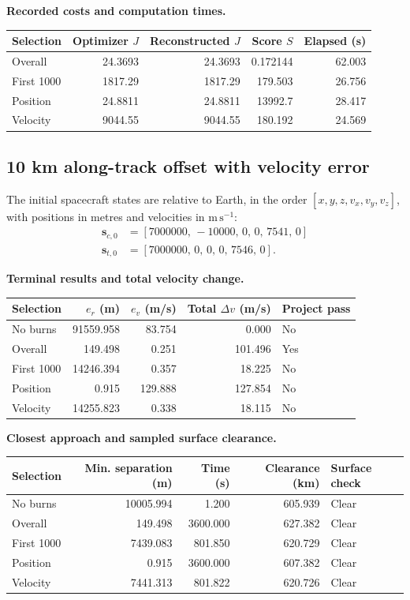 \par\noindent\textbf{Recorded costs and computation times.}
\begin{center}
\begin{tabular}{lrrrr}
\toprule
Selection & Optimizer $J$ & Reconstructed $J$ & Score $S$ & Elapsed (s)\\
\midrule
Overall & 24.3693 & 24.3693 & 0.172144 & 62.003\\
First 1000 & 1817.29 & 1817.29 & 179.503 & 26.756\\
Position & 24.8811 & 24.8811 & 13992.7 & 28.417\\
Velocity & 9044.55 & 9044.55 & 180.192 & 24.569\\
\bottomrule
\end{tabular}
\end{center}
\clearpage
\subsection{10 km along-track offset with velocity error}
The initial spacecraft states are relative to Earth, in the order
$[x,y,z,v_x,v_y,v_z]$, with positions in metres and velocities in
$\mathrm{m\,s^{-1}}$:
\begin{align*}
\mathbf s_{c,0}&=[7000000,\,-10000,\,0,\,0,\,7541,\,0]\\
\mathbf s_{t,0}&=[7000000,\,0,\,0,\,0,\,7546,\,0].
\end{align*}
\par\noindent\textbf{Terminal results and total velocity change.}
\begin{center}
\begin{tabular}{lrrrl}
\toprule
Selection & $e_r$ (m) & $e_v$ (m/s) & Total $\Delta v$ (m/s) & Project pass\\
\midrule
No burns & 91559.958 & 83.754 & 0.000 & No\\
Overall & 149.498 & 0.251 & 101.496 & Yes\\
First 1000 & 14246.394 & 0.357 & 18.225 & No\\
Position & 0.915 & 129.888 & 127.854 & No\\
Velocity & 14255.823 & 0.338 & 18.115 & No\\
\bottomrule
\end{tabular}
\end{center}
\par\noindent\textbf{Closest approach and sampled surface clearance.}
\begin{center}
\begin{tabular}{lrrrl}
\toprule
Selection & Min. separation (m) & Time (s) & Clearance (km) & Surface check\\
\midrule
No burns & 10005.994 & 1.200 & 605.939 & Clear\\
Overall & 149.498 & 3600.000 & 627.382 & Clear\\
First 1000 & 7439.083 & 801.850 & 620.729 & Clear\\
Position & 0.915 & 3600.000 & 607.382 & Clear\\
Velocity & 7441.313 & 801.822 & 620.726 & Clear\\
\bottomrule
\end{tabular}
\end{center}

